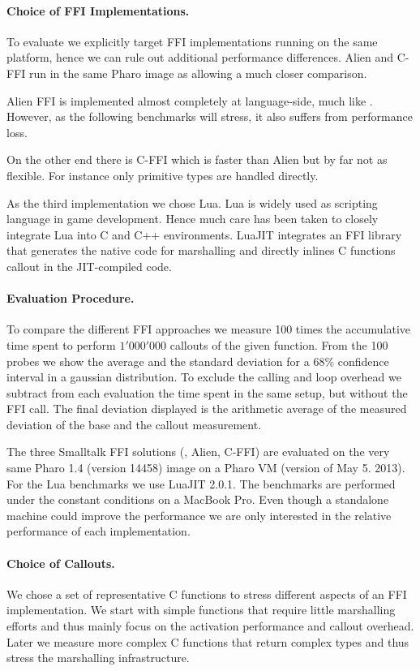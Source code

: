 \paragraph{Choice of FFI Implementations.}
To evaluate \NB we explicitly target FFI implementations running on the same platform, hence we can rule out additional performance differences.
Alien and C-FFI run in the same Pharo image as \NB allowing a much closer comparison.

Alien FFI is implemented almost completely at language-side, much like \NB.
However, as the following benchmarks will stress, it also suffers from performance loss.

On the other end there is C-FFI which is faster than Alien but by far not as flexible. For instance only primitive types are handled directly.

As the third implementation we chose Lua. Lua is widely used as scripting language in game development.
Hence much care has been taken to closely integrate Lua into C and C++ environments.
LuaJIT integrates an FFI library that generates the native code for marshalling and directly inlines C functions callout in the JIT-compiled code.

\paragraph{Evaluation Procedure.}
To compare the different FFI approaches we measure 100 times the accumulative time spent to perform $1'000'000$ callouts of the given function.
From the 100 probes we show the average and the standard deviation for a $68\%$ confidence interval in a gaussian distribution.
To exclude the calling and loop overhead we subtract from each evaluation the time spent in the same setup, but without the FFI call.
The final deviation displayed is the arithmetic average of the measured deviation of the base and the callout measurement.

The three Smalltalk FFI solutions (\NB, Alien, C-FFI) are evaluated on the very same Pharo 1.4 (version 14458) image on a Pharo VM (version of May 5. 2013).
For the Lua benchmarks we use LuaJIT 2.0.1.
The benchmarks are performed under the constant conditions on a MacBook Pro.
Even though a standalone machine could improve the performance we are only interested in the relative performance of each implementation.


\paragraph{Choice of Callouts.}
We chose a set of representative C functions to stress different aspects of an FFI implementation.
We start with simple functions that require little marshalling efforts and thus mainly focus on the activation performance and callout overhead.
Later we measure more complex C functions that return complex types and thus stress the marshalling infrastructure.

